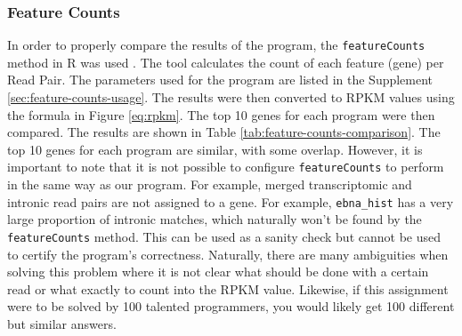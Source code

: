 \documentclass{article}
\begin{document}
    \subsubsection{Feature Counts}
    In order to properly compare the results of the program, the \texttt{featureCounts} method in R was used \cite{liao_smyth_shi_2013}. The tool calculates the count of each feature (gene) per Read Pair. The parameters used for the program are listed in the Supplement \ref{sec:feature-counts-usage}. The results were then converted to RPKM values using the formula in Figure \ref{eq:rpkm}. The top 10 genes for each program were then compared. The results are shown in Table \ref{tab:feature-counts-comparison}. The top 10 genes for each program are similar, with some overlap. However, it is important to note that it is not possible to configure \texttt{featureCounts} to perform in the same way as our program. For example, merged transcriptomic and intronic read pairs are not assigned to a gene. For example, \texttt{ebna\_hist} has a very large proportion of intronic matches, which naturally won't be found by the \texttt{featureCounts} method. This can be used as a sanity check but cannot be used to certify the program's correctness. Naturally, there are many ambiguities when solving this problem where it is not clear what should be done with a certain read or what exactly to count into the RPKM value. Likewise, if this assignment were to be solved by 100 talented programmers, you would likely get 100 different but similar answers.
\end{document}
